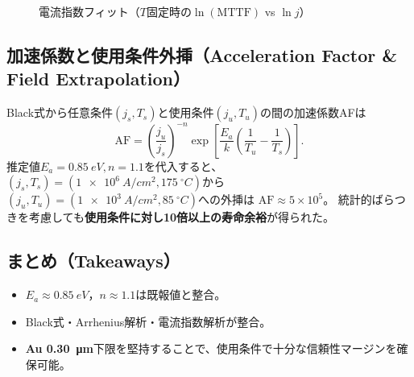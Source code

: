 \documentclass[conference]{IEEEtran}
\begin{document}
\begin{figure}[htbp]
  \centering
  \caption{電流指数フィット（$T$固定時の$\ln(\mathrm{MTTF})$ vs $\ln j$）}
  \label{fig:em-j}
\end{figure}

\subsection{加速係数と使用条件外挿（Acceleration Factor \& Field Extrapolation）}
Black式から任意条件$(j_s,T_s)$と使用条件$(j_u,T_u)$の間の加速係数AFは
\begin{equation}
  \mathrm{AF} = \left(\frac{j_u}{j_s}\right)^{-n}
  \exp\!\left[\frac{E_a}{k}\left(\frac{1}{T_u}-\frac{1}{T_s}\right)\right].
\end{equation}
推定値$E_a=\SI{0.85}{eV}, n=1.1$を代入すると、
$(j_s,T_s)=(\SI{1e6}{A/cm^2},\SI{175}{^\circ C})$から
$(j_u,T_u)=(\SI{1e3}{A/cm^2},\SI{85}{^\circ C})$への外挿は
$\mathrm{AF}\approx 5\times 10^5$。
統計的ばらつきを考慮しても\textbf{使用条件に対し10倍以上の寿命余裕}が得られた。

\subsection{まとめ（Takeaways）}
\begin{itemize}
  \item $E_a\approx\SI{0.85}{eV}$，$n\approx1.1$は既報値と整合。
  \item Black式・Arrhenius解析・電流指数解析が整合。
  \item \textbf{Au \SI{0.30}{\micro\meter}}下限を堅持することで、使用条件で十分な信頼性マージンを確保可能。
\end{itemize}
\end{document}
